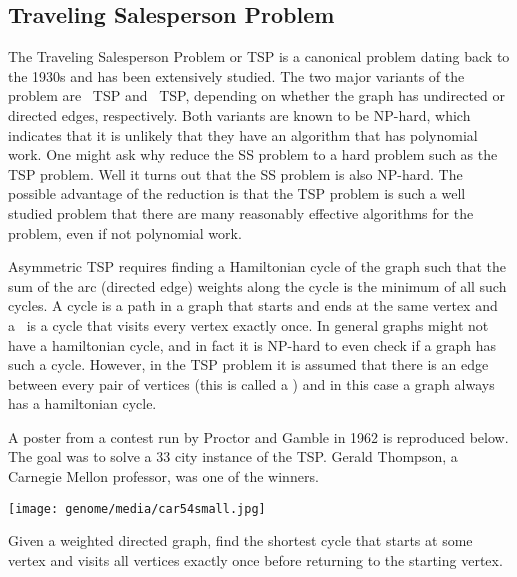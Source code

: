\subsection{Traveling Salesperson Problem}

\begin{gram}
The Traveling Salesperson Problem or TSP is a canonical 
problem dating back to the 1930s and has been extensively studied.
%
The two major variants of the problem are~ TSP
and~ TSP, depending on whether the graph has
undirected or directed edges, respectively.
%
Both variants are known to be NP-hard, which indicates that it is
unlikely that they have an algorithm that has polynomial work.
%
One might ask why reduce the SS problem to a hard problem such as the
TSP problem.   Well it turns out that the SS problem is also NP-hard.    The
possible advantage of the reduction is that the TSP problem is such a
well studied problem that there are many reasonably effective
algorithms for the problem, even if not polynomial work.
\end{gram}

\begin{gram}
Asymmetric TSP requires finding a Hamiltonian cycle of the
graph such that the sum of the arc (directed edge) weights along the
cycle is the minimum of all such cycles.
%
A cycle is a path in a graph that starts and ends at the
same vertex and a~ is a cycle that visits
every vertex exactly once.
%
In general graphs might not have a hamiltonian cycle, and in fact it
is NP-hard to even check if a graph has such a cycle.    However, in
the TSP problem it is assumed that there is an edge between every
pair of vertices (this is called a ) 
and in this case a graph always has a hamiltonian cycle.
\end{gram}

\begin{example}
A poster from a contest run by Proctor and Gamble in 1962 is
reproduced below.  The goal was to solve a 33 city instance of the
TSP.  Gerald Thompson, a Carnegie Mellon professor, was one of the
winners.

\begin{center}
\texttt{[image: genome/media/car54small.jpg]}
\end{center}
\end{example}

\begin{problem}
  Given a weighted directed graph, find the shortest cycle that starts
  at some vertex and visits all vertices exactly once before returning
  to the starting vertex.
\end{problem}


